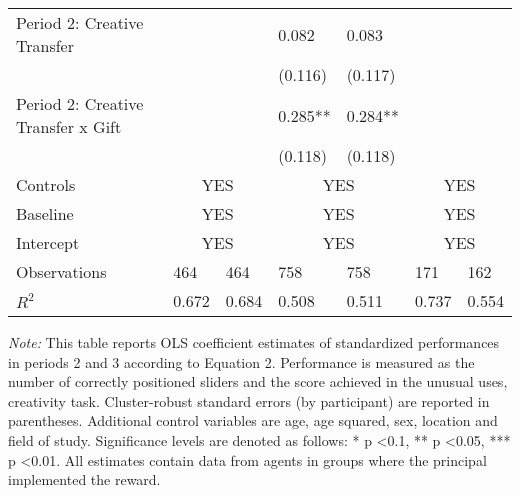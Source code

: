 \documentclass{article}
\begin{document}
\begin{table}[H]
\begin{center}
{\begin{tabular}{lll|ll|ll}
Period 2: Creative Transfer&               &               &       0.082   &       0.083   &               &               \\
                    &               &               &     (0.116)   &     (0.117)   &               &               \\[2mm]
Period 2: Creative Transfer x Gift&               &               &       0.285** &       0.284** &               &               \\
                    &               &               &     (0.118)   &     (0.118)   &               &               \\[2mm]
\hline \noalign{\smallskip}
Controls        & \multicolumn{2}{c|}{YES} & \multicolumn{2}{c|}{YES} & \multicolumn{2}{c}{YES}   \\
Baseline        & \multicolumn{2}{c|}{YES} & \multicolumn{2}{c|}{YES} & \multicolumn{2}{c}{YES}   \\
Intercept      & \multicolumn{2}{c|}{YES} & \multicolumn{2}{c|}{YES} & \multicolumn{2}{c}{YES}   \\
\hline \noalign{\smallskip}
Observations        &         464   &         464   &         758   &         758   &         171   &         162   \\
$R^2$               &       0.672   &       0.684   &       0.508   &       0.511   &       0.737   &       0.554   \\
\hline
\end{tabular}}
\begin{minipage}{\linewidth}
\footnotesize
\vspace{5mm}
{\it Note:} This table reports OLS coefficient estimates of standardized performances in periods 2 and 3 according to Equation 2. Performance is measured as the number of correctly positioned sliders and the score achieved in the unusual uses, creativity task. Cluster-robust standard errors (by participant) are reported in parentheses. Additional control variables are age, age squared, sex, location and field of study. Significance levels are denoted as follows: * p \textless 0.1, ** p \textless 0.05, *** p \textless 0.01. All estimates contain data from agents in groups where the principal implemented the reward.
\end{minipage}
\end{center}
\end{table}
\end{document}
